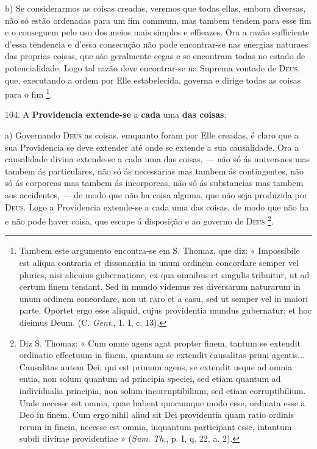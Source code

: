 b) Se considerarmos as coisas creadas, veremos que todas ellas, embora diversas, não só estão ordenadas para um fim commum, mas tambem tendem para esse fim e o conseguem pelo uso dos meios mais simples e effieazes. Ora a razão sufficiente d'essa tendencia e d'essa consecução não pode encontrar-se nas energias naturaes das proprias coisas, que são geralmente cegas e se encontram todas no estado de potencialidade. Logo tal razão deve encontrar-se na Suprema vontade de \textsc{Deus}, que, executando a ordem por Elle estabelecida, governa e dirige todas as coisas para o fim \footnote{Tambem este argumento encontra-se em S. Thomaz, que diz: « Impossibile est aliqua contraria et dissonantia in unum ordinem concordare semper vel pluries, nisi alicuius gubernatione, ex qua omnibus et singulis tribuitur, ut ad certum finem tendant. Sed in mundo videmus res diversarum naturarum in unum ordinem concordare, non ut raro et a casu, sed ut semper vel in maiori parte. Oportet ergo esse aliquid, cujus providentia mundus gubernatur; et hoc dieimus Deum. (C. \emph{Gent}., 1. I, c. 13).}.

 104. A \textbf{Providencia extende-se} a \textbf{cada} uma \textbf{das coisas}.

a) Governando \textsc{Deus} as coisas, emquanto foram por Elle creadas, é claro que a sua Providencia se deve extender até onde se extende a sua causalidade. Ora a causalidade divina extende-se a cada uma das coisas, --- não só ás universaes mas tambem ás particulares, não só ás necessarias mas tambem ás contingentes, não só ás corporeas mas tambem ás incorporeas, não só ás substancias mas tambem aos accidentes, --- de modo que não ha coisa alguma, que não seja produzida por \textsc{Deus}. Logo a Providencia extende-se a cada uma das coisas, de modo que não ha e não pode haver coisa, que escape á disposição e ao governo de \textsc{Deus} \footnote{Diz S. Thomaz: « Cum omne agens agat propter finem, tantum se extendit ordinatio effectuum in finem, quantum se extendit causalitas primi agentis... Causalitas autem Dei, qui est primum agens, se extendit usque ad omnia entia, non solum quantum ad principia speciei, sed etiam quantum ad individualia principia, non solum incorruptibilium, sed etiam corruptibilium. Unde necesse est omnia, quae habent quocumque modo esse, ordinata esse a Deo in finem. Cum ergo nihil aliud sit Dei providentia quam ratio ordinis rerum in finem, necesse est omnia, inquantum participant esse, intantum subdi divinae providentiae » (\emph{Sum}. \emph{Th}., p. I, q. 22, a. 2).}.

